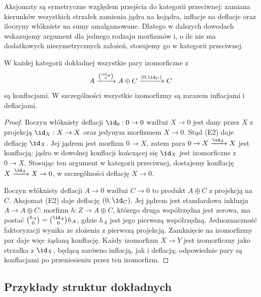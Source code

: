 Aksjomaty są symetryczne względem przejścia do kategorii przeciwnej: zamiana kierunków wszystkich strzałek zamienia jądra na kojądra, inflacje na deflacje oraz iloczyny włókniste na sumy amalgamowane. Dlatego w dalszych dowodach wskazujemy argument dla jednego rodzaju morfizmów i, o ile nie ma dodatkowych niesymetrycznych założeń, stosujemy go w kategorii przeciwnej.

\begin{stwierdzenie}\label{cat:prop:quillen-split-included}
W każdej kategorii dokładnej wszystkie pary izomorficzne z
\[
 A\xrightarrow{\binom{\id_A}{0}} A\oplus C
 \xrightarrow{(0,\id_C)}C
\]
są konflacjami. W szczególności wszystkie izomorfizmy są zarazem inflacjami i deflacjami.
\end{stwierdzenie}
\begin{proof}
Iloczyn włóknisty deflacji $\id_0:0\to0$ wzdłuż $X\to0$ jest dany przez $X$ z projekcją $\id_X:X\to X$ oraz jedynym morfizmem $X\to0$. Stąd (E2) daje deflację $\id_X$. Jej jądrem jest morfizm $0\to X$, zatem para $0\to X\xrightarrow{\id_X}X$ jest konflacją: jądro w dowolnej konflacji kończącej się $\id_X$ jest izomorficzne z $0\to X$. Stosując ten argument w kategorii przeciwnej, dostajemy konflację $X\xrightarrow{\id_X}X\to0$, w szczególności deflację $X\to0$.

Iloczyn włóknisty deflacji $A\to0$ wzdłuż $C\to0$ to produkt $A\oplus C$ z projekcją na $C$. Aksjomat (E2) daje deflację $(0,\id_C)$. Jej jądrem jest standardowa inkluzja $A\to A\oplus C$: morfizm $h:Z\to A\oplus C$, którego druga współrzędna jest zerowa, ma postać $\binom{h_A}{0}=\binom{\id_A}{0}h_A$, gdzie $h_A$ jest jego pierwszą współrzędną. Jednoznaczność faktoryzacji wynika ze złożenia z pierwszą projekcją. Zamknięcie na izomorfizmy par daje więc żądaną konflację. Każdy izomorfizm $X\to Y$ jest izomorficzny jako strzałka z $\id_X$, będącą zarówno inflacją, jak i deflacją; odpowiednie pary są konflacjami po przeniesieniu przez ten izomorfizm.
\end{proof}

\subsection{Przykłady struktur dokładnych}

